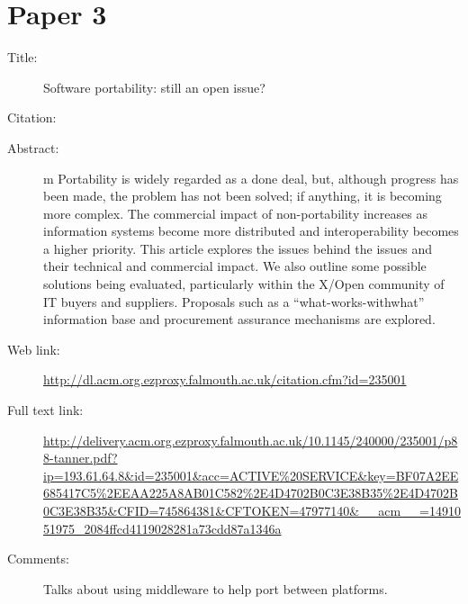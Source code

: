 \documentclass{scrartcl}
\begin{document}
\section*{Paper 3}
\begin{description}
\item[Title:] Software portability: still an open issue?
\item[Citation:] \cite{tanner1996software}
\item[Abstract:] m Portability is widely regarded as a
done deal, but, although progress has been made, the problem has not been solved; if anything, it is becoming more complex. The commercial impact of non-portability increases as information systems become more distributed and interoperability becomes a higher priority. This article explores the issues behind the issues and their technical and commercial impact. We also outline some possible solutions being evaluated, particularly within the X/Open community of IT buyers and suppliers. Proposals such as a “what-works-withwhat” information base and procurement assurance mechanisms are explored.
\item[Web link:] \url{http://dl.acm.org.ezproxy.falmouth.ac.uk/citation.cfm?id=235001}
\item[Full text link:] \url{http://delivery.acm.org.ezproxy.falmouth.ac.uk/10.1145/240000/235001/p88-tanner.pdf?ip=193.61.64.8&id=235001&acc=ACTIVE%20SERVICE&key=BF07A2EE685417C5%2EEAA225A8AB01C582%2E4D4702B0C3E38B35%2E4D4702B0C3E38B35&CFID=745864381&CFTOKEN=47977140&__acm__=1491051975_2084ffcd4119028281a73cdd87a1346a}
\item[Comments:] Talks about using middleware to help port between platforms.
\end{description}
\end{document}
